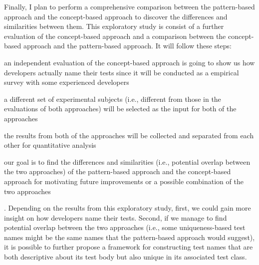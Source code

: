 Finally, I plan to perform a comprehensive comparison between the pattern-based approach and the concept-based approach to discover the differences and similarities between them.
%
This exploratory study is consist of a further evaluation of the concept-based approach and a comparison between the concept-based approach and the pattern-based approach.
%
It will follow these steps:
\begin{enumerate*}
\item an independent evaluation of the concept-based approach is going to show us how developers actually name their tests since it will be conducted as a empirical survey with some experienced developers
\item a different set of experimental subjects (i.e., different from those in the evaluations of both approaches) will be selected as the input for both of the approaches
\item the results from both of the approaches will be collected and separated from each other for quantitative analysis
\item our goal is to find the differences and similarities (i.e., potential overlap between the two approaches) of the pattern-based approach and the concept-based approach for motivating future improvements or a possible combination of the two approaches
\end{enumerate*}.
%
Depending on the results from this exploratory study, first, we could gain more insight on how developers name their tests.
%
Second, if we manage to find potential overlap between the two approaches (i.e., some uniqueness-based test names might be the same names that the pattern-based approach would suggest), it is possible to further propose a framework for constructing test names that are both descriptive about its test body but also unique in its associated test class.
